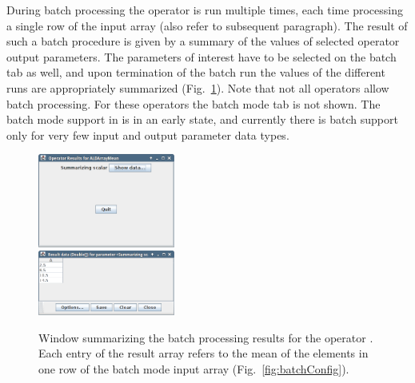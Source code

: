 \vspace*{-0.5cm}
During batch processing the operator is run multiple times, each time processing
a single row of the input array (also refer to subsequent paragraph).
The result of such a batch procedure is given by a summary of the values
of selected operator output parameters. The parameters of interest have to be
selected on the batch tab as well, and upon termination of the batch run the
values of the different runs are appropriately summarized
(Fig.~\ref{fig:batchResult}). Note that not all operators allow batch
processing. For these operators the batch mode tab is not shown. The batch mode
support in \alida is in an early state, and currently there is batch support
only for very few input and output parameter data types.
\begin{center}
\begin{figure}[t]
\begin{center}
\hspace*{-2cm}
\includegraphics[width=0.4\textwidth,clip,trim=0 0 0 0]
                {../images/screenShotALDArrayMeanBatchResult.png}\\[-2.5cm]
\hspace*{1cm}            
\includegraphics[width=0.4\textwidth,clip,trim=0 0 0 0]
                {../images/screenShotALDArrayMeanBatchResultValues.png}
\caption{\label{fig:batchResult}Window summarizing the batch processing results
for the operator . Each entry of the result array refers to
the mean of the elements in one row of the batch mode input array
(Fig.~\ref{fig:batchConfig}).}
\end{center}
\end{figure}
\end{center}

\vspace*{-0.5cm}
